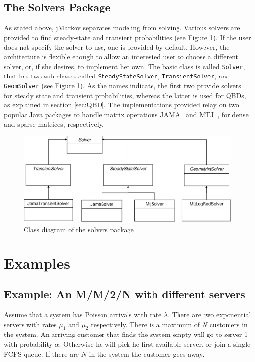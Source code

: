 \documentclass[11pt,letterpaper]{article}
\begin{document}
\subsection{The Solvers Package}\label{sec:SolversModule}

As stated above, jMarkov separates modeling from solving.  Various solvers are
provided to find steady-state and transient probabilities (see Figure
\ref{fg:SolversModuleDiag}).  If the user does not specify the solver to use,
one is provided by default.  However, the architecture is flexible enough to
allow an interested user to choose a different solver, or, if she desires, to
implement her own.  The basic class is called \texttt{Solver}, that has two
sub-classes called \texttt{Steady\-State\-Solver}, \texttt{Transient\-Solver},
and \texttt{Geom\-Solver} (see Figure \ref{fg:SolversModuleDiag}).  As the names
indicate, the first two provide solvers for steady state and transient
probabilities, whereas the latter is used for QBDs, as explained in section
\ref{sec:QBD}.  The implementations provided relay on two popular Java packages
to handle matrix operations JAMA~\cite{hick.clev.ea05} and MTJ~\cite{Heim05},
for dense and sparse matrices, respectively.

\begin{figure}[htb]
    \centering
  \includegraphics[width=0.95\columnwidth]{pics/SolversModuleDiag}
  \caption{Class diagram of the solvers package}\label{fg:SolversModuleDiag}
\end{figure}

\section{Examples}

\subsection{Example: An  M/M/2/N with different servers}

Assume that a system has Poisson arrivals with rate $\lambda$.  There are two
exponential servers with rates $\mu_1$ and $\mu_2$ respectively. There is a
maximum of $N$ customers in the system.  An arriving customer that finds the
system empty will go to server 1 with probability $\alpha$. Otherwise he will
pick he first available server, or join a single FCFS queue. If there are $N$ in
the system the customer goes away.
\end{document}

